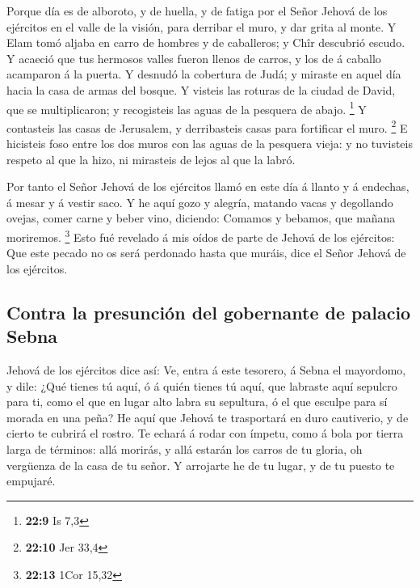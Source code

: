  Porque día es de alboroto, y de huella, y de fatiga por el
Señor Jehová de los ejércitos en el valle de la visión, para derribar el
muro, y dar grita al monte.  Y Elam tomó aljaba en carro de
hombres y de caballeros; y Chîr descubrió escudo.  Y acaeció
que tus hermosos valles fueron llenos de carros, y los de á caballo
acamparon á la puerta.  Y desnudó la cobertura de Judá; y
miraste en aquel día hacia la casa de armas del bosque.  Y
visteis las roturas de la ciudad de David, que se multiplicaron; y
recogisteis las aguas de la pesquera de abajo. \footnote{\textbf{22:9}
  Is 7,3}  Y contasteis las casas de Jerusalem, y
derribasteis casas para fortificar el muro. \footnote{\textbf{22:10} Jer
  33,4}  E hicisteis foso entre los dos muros con las aguas
de la pesquera vieja: y no tuvisteis respeto al que la hizo, ni
mirasteis de lejos al que la labró.

 Por tanto el Señor Jehová de los ejércitos llamó en este
día á llanto y á endechas, á mesar y á vestir saco.  Y he
aquí gozo y alegría, matando vacas y degollando ovejas, comer carne y
beber vino, diciendo: Comamos y bebamos, que mañana moriremos.
\footnote{\textbf{22:13} 1Cor 15,32}  Esto fué revelado á
mis oídos de parte de Jehová de los ejércitos: Que este pecado no os
será perdonado hasta que muráis, dice el Señor Jehová de los ejércitos.

\hypertarget{contra-la-presunciuxf3n-del-gobernante-de-palacio-sebna}{%
\subsection{Contra la presunción del gobernante de palacio
Sebna}\label{contra-la-presunciuxf3n-del-gobernante-de-palacio-sebna}}

 Jehová de los ejércitos dice así: Ve, entra á este
tesorero, á Sebna el mayordomo, y dile:  ¿Qué tienes tú
aquí, ó á quién tienes tú aquí, que labraste aquí sepulcro para ti, como
el que en lugar alto labra su sepultura, ó el que esculpe para sí morada
en una peña?  He aquí que Jehová te trasportará en duro
cautiverio, y de cierto te cubrirá el rostro.  Te echará á
rodar con ímpetu, como á bola por tierra larga de términos: allá
morirás, y allá estarán los carros de tu gloria, oh vergüenza de la casa
de tu señor.  Y arrojarte he de tu lugar, y de tu puesto te
empujaré.

